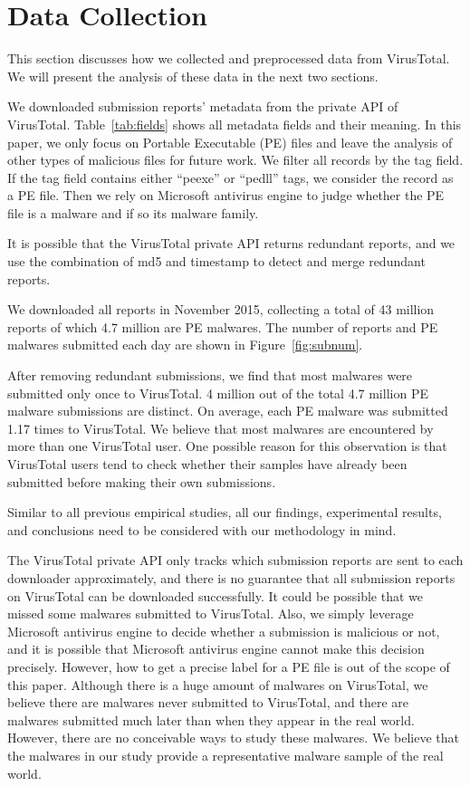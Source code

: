 

\section{Data Collection}
\label{sec:meth}

This section discusses how we collected and preprocessed data from VirusTotal.
We will present the analysis of these data in the next two sections.

We downloaded submission reports' metadata from the private API of VirusTotal. 
Table~\ref{tab:fields} shows all metadata fields and their meaning. 
In this paper, we only focus on Portable Executable (PE) files 
and leave the analysis of other types of malicious files for future work. 
We filter all records by the tag field. 
If the tag field contains either ``peexe'' or ``pedll'' tags, we consider the record as a PE file. 
Then we rely on Microsoft antivirus engine to judge whether the PE file is a malware and if so its malware family.

It is possible that the VirusTotal private API returns redundant reports, 
and we use the combination of md5 and timestamp
 to detect and merge redundant reports.

We downloaded all reports in November 2015, collecting a total of 43 million reports of which 4.7 million are PE malwares. 
The number of reports and PE malwares submitted each day are shown in Figure~\ref{fig:subnum}.

After removing redundant submissions, we find that most malwares were submitted only once to VirusTotal. 
4 million out of the total 4.7 million PE malware submissions are distinct. 
On average, each PE malware was submitted 1.17 times to VirusTotal. We believe that most malwares are encountered by more than one VirusTotal user. 
One possible reason for this observation is that VirusTotal users 
tend to check whether their samples have already been submitted
before making their own submissions.

Similar to all previous empirical studies, all our findings, experimental results, 
and conclusions need to be considered with our methodology in mind. 

The VirusTotal private API only tracks which submission reports are sent to each downloader approximately, 
and there is no guarantee that all submission reports on VirusTotal can be downloaded successfully. 
It could be possible that we missed some malwares submitted to VirusTotal. 
Also, we simply leverage Microsoft antivirus engine to decide whether a submission is malicious or not, 
and it is possible that Microsoft antivirus engine cannot make this decision precisely. 
However, how to get a precise label for a PE file is out of the scope of this paper.  
Although there is a huge amount of malwares on VirusTotal, we believe there are malwares never submitted to VirusTotal, 
and there are malwares submitted much later than when they appear in the real world.
However, there are no conceivable ways to study these malwares. 
We believe that the malwares in our study provide a representative malware sample of the real world. 


